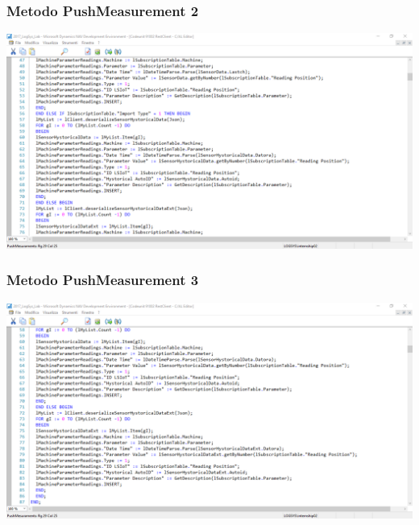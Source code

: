 \documentclass{beamer}
\begin{document}
\begin{frame}
\frametitle{Metodo PushMeasurement 2}
\includegraphics[width=1\textwidth]{images/NAVPushMeasuraments2.png}
\end{frame}

\begin{frame}
\frametitle{Metodo PushMeasurement 3}
\includegraphics[width=1\textwidth]{images/NAVPushMeasuraments3.png}
\end{frame}
\end{document}
